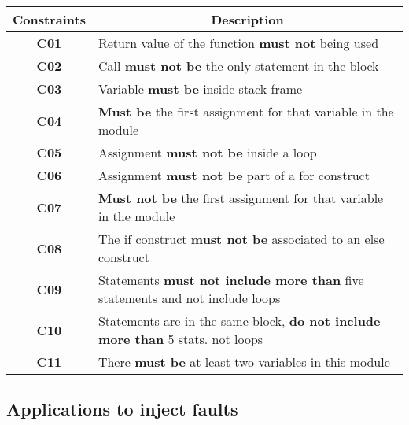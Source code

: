\begin{table}[!ht]
\centering
\begin{tabular}{|c|p{12cm}|}
\hline
\textbf{Constraints}            & \multicolumn{1}{c|}{\textbf{Description}}                                     \\ \hline \hline
\textbf{C01}       \label{C01}  & Return value of the function \textbf{must not} being used                              \\ \hline
\textbf{C02}       \label{C02}  & Call \textbf{must not be} the only statement in the block                              \\ \hline
\textbf{C03}       \label{C03}  & Variable \textbf{must be} inside stack frame                                           \\ \hline
\textbf{C04}       \label{C04}  & \textbf{Must be} the first assignment for that variable in the module                  \\ \hline
\textbf{C05}       \label{C05}  & Assignment \textbf{must not be} inside a loop                                          \\ \hline
\textbf{C06}       \label{C06}  & Assignment \textbf{must not be} part of a for construct                                \\ \hline
\textbf{C07}       \label{C07}  & \textbf{Must not be} the first assignment for that variable in the module              \\ \hline
\textbf{C08}       \label{C08}  & The if construct \textbf{must not be} associated to an else construct                  \\ \hline
\textbf{C09}       \label{C09}  & Statements \textbf{must not include more than} five statements and not include loops   \\ \hline
\textbf{C10}       \label{C010} & Statements are in the same block, \textbf{do not include more than} 5 stats. not loops \\ \hline
\textbf{C11}       \label{C011} & There \textbf{must be} at least two variables in this module                           \\ \hline
\end{tabular}
\end{table}

\clearpage
\subsection{Applications to inject faults}


